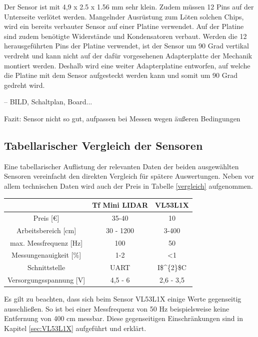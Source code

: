 Der Sensor ist mit 4,9 x 2.5 x 1.56 mm sehr klein. Zudem müssen 12 Pins auf der Unterseite verlötet werden. Mangelnder Ausrüstung zum Löten solchen Chips, wird ein bereits verbauter Sensor auf einer Platine verwendet. Auf der Platine sind zudem benötigte Widerstände und Kondensatoren verbaut. Werden die 12 herausgeführten Pins der Platine verwendet, ist der Sensor um 90 Grad vertikal verdreht und kann nicht auf der dafür vorgesehenen Adapterplatte der Mechanik montiert werden. Deshalb wird eine weiter Adapterplatine entworfen, auf welche die Platine mit dem Sensor aufgesteckt werden kann und somit um 90 Grad gedreht wird.



-- BILD, Schaltplan, Board...


Fazit: Sensor nicht so gut, aufpassen bei Messen wegen äußeren Bedingungen



\subsection{Tabellarischer Vergleich der Sensoren}

Eine tabellarischer Auflistung der relevanten Daten der beiden ausgewählten Sensoren vereinfacht den direkten Vergleich für spätere Auswertungen. Neben vor allem technischen Daten wird auch der Preis in Tabelle \ref{vergleich} aufgenommen.

\begin{center}
	\begin{tabular} [H] {|c|c|c|}
		\hline
		\textbf{} 				& \textbf{Tf Mini LIDAR}	& \textbf{VL53L1X} 	 \\ \hline
		Preis [€]				&  35-40					& 10			\\ \hline
		Arbeitsbereich [cm]		&  30 - 1200   				& 3-400			\\ \hline
		max. Messfrequenz [Hz]	&  100						& 50 			\\ \hline
		Messungenauigkeit [\%]	&  1-2 						& <1			\\ \hline
		Schnittstelle 			&  \ac{UART}				& \ac{I$^{2}$C}\\ \hline
		Versorgungsspannung [V] &  4,5 - 6 					& 2,6 - 3,5		\\ \hline
		
		\end {tabular}
		\label{vergleich}
	\end{center}

Es gilt zu beachten, dass sich beim Sensor VL53L1X einige Werte gegenseitig ausschließen. So ist bei einer Messfrequenz von 50 Hz beispielsweise keine Entfernung von 400 cm messbar. Diese gegenseitigen Einschränkungen sind in Kapitel \ref{sec:VL53L1X} aufgeführt und erklärt.

